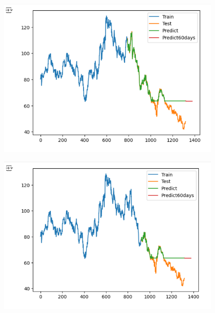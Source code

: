 \documentclass{article}
\begin{document}
\begin{multicols}{2}
\begin{figure}[H]
    \centering
    \begin{minipage}{0.15\textwidth}
    \centering
    \includegraphics[width=1\textwidth]{Image/GradientBoosting/SONY_60_6_4_GradientBoostingRegressor.png}
   
    \label{fig:1}
    \end{minipage}%
    \begin{minipage}{0.15\textwidth}
    \centering
    \includegraphics[width=1\textwidth]{Image/GradientBoosting/SONY_60_7_3_GradientBoostingRegressor.png}
  

\end{minipage}
\end{figure}
\end{multicols}
\end{document}
